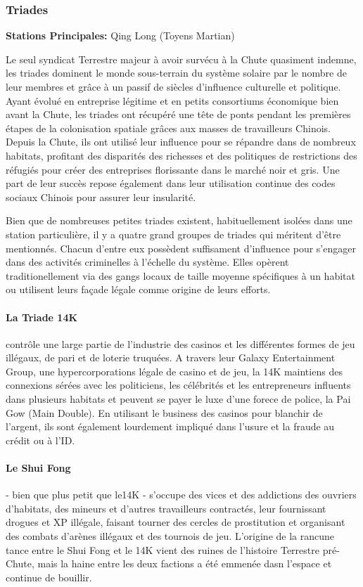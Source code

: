 \subsubsection{Triades} \label{sec:triads} 

\textbf{Stations Principales:} Qing Long (Toyens Martian) 

Le seul syndicat Terrestre majeur à avoir survécu à la Chute quasiment indemne, les triades dominent le monde sous-terrain du système solaire par le nombre de leur membres et grâce à un passif de siècles d'influence culturelle et politique. Ayant évolué en entreprise légitime et en petits consortiums économique bien avant la Chute, les triades ont récupéré une tête de ponts pendant les premières étapes de la colonisation spatiale grâces aux masses de travailleurs Chinois. Depuis la Chute, ils ont utilisé leur influence pour se répandre dans de nombreux habitats, profitant des disparités des richesses et des politiques de restrictions des réfugiés pour créer des entreprises florissante dans le marché noir et gris. Une part de leur succès repose également dans leur utilisation continue des codes sociaux Chinois pour assurer leur insularité. 

Bien que de nombreuses petites triades existent, habituellement isolées dans une station particulière, il y a quatre grand groupes de triades qui méritent d'être mentionnés. Chacun d'entre eux possèdent suffisament d'influence pour s'engager dans des activités criminelles à l'échelle du système. Elles opèrent traditionellement via des gangs locaux de taille moyenne spécifiques à un habitat ou utilisent leurs façade légale comme origine de leurs efforts. 

\paragraph{La Triade 14K} \label{sec:14k-triad} contrôle une large partie de l'industrie des casinos et les différentes formes de jeu illégaux, de pari et de loterie truquées. A travers leur Galaxy Entertainment Group, une hypercorporations légale de casino et de jeu, la 14K maintiens des connexions sérées avec les politiciens, les célébrités et les entrepreneurs influents dans plusieurs habitats et peuvent se payer le luxe d'une forece de police, la Pai Gow (Main Double). En utilisant le business des casinos pour blanchir de l'argent, ils sont également lourdement impliqué dans l'usure et la fraude au crédit ou à l'ID. 

\paragraph{Le Shui Fong} \label{sec:shui-fong} - bien que plus petit que le14K - s'occupe des vices et des addictions des ouvriers d'habitats, des mineurs et d'autres travailleurs contractés, leur fournissant drogues et XP illégale, faisant tourner des cercles de prostitution et organisant des combats d'arènes illégaux et des tournois de jeu. L'origine de la rancune tance entre le  Shui Fong et le 14K vient des ruines de l'histoire Terrestre pré-Chute, mais la haine entre les deux factions a été emmenée dasn l'espace et continue de bouillir. 

